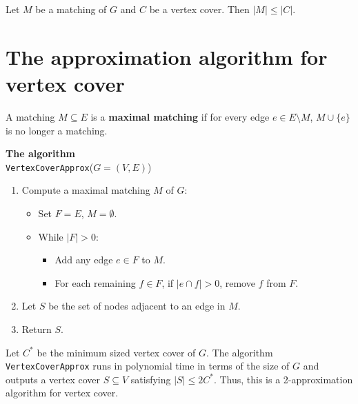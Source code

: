 \documentclass[11  pt]{article}
\begin{document}
\vs{5cm}
\begin{lemma}
Let $M$ be a matching of $G$ and $C$ be a vertex cover. Then $|M| \leq |C|$.
\end{lemma}

\vfill

\section{The approximation algorithm for vertex cover}
A matching $M \subseteq E$ is a \textbf{maximal matching} if for every edge $e \in E \setminus M$, $M \cup \{e\}$ is no longer a matching.

\vs{8cm}
\textbf{The algorithm} \\
\texttt{VertexCoverApprox}($G = (V, E)$)
\begin{enumerate}
    \item Compute a maximal matching $M$ of $G$:
    \begin{itemize}
        \item Set $F = E$, $M = \emptyset$.
        \item While $|F| > 0$:
        \begin{itemize}
            \item Add any edge $e \in F$ to $M$.
            \item For each remaining $f \in F$, if $|e \cap f| > 0$, remove $f$ from $F$.
        \end{itemize}
    \end{itemize}
    \item Let $S$ be the set of nodes adjacent to an edge in $M$.
    \item Return $S$.
\end{enumerate}

\newpage
\begin{theorem}
Let $C^*$ be the minimum sized vertex cover of $G$. The algorithm \texttt{VertexCoverApprox} runs in polynomial time in terms of the size of $G$ and outputs a vertex cover $S \subseteq V$ satisfying $|S| \leq 2C^*$. Thus, this is a 2-approximation algorithm for vertex cover.
\end{theorem}

\newpage
\phantom{Invisible space}
\end{document}
